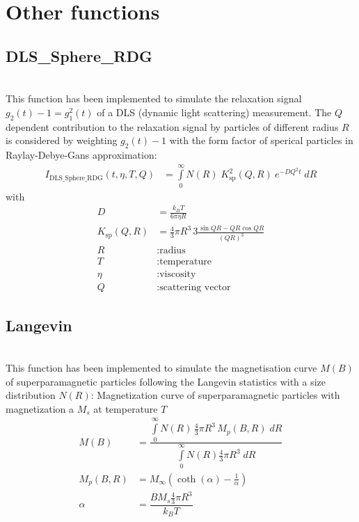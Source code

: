 \section{Other functions}

\subsection{DLS\_Sphere\_RDG}  ~\\

This function has been implemented to simulate the relaxation
signal $g_2(t)-1 = g_1^2(t)$ of a DLS (dynamic light scattering)
measurement. The $Q$ dependent contribution to the relaxation
signal by particles of different radius $R$ is considered by
weighting $g_2(t)-1$ with the form factor of sperical particles in
Raylay-Debye-Gans approximation:
\begin{align}
   I_\text{DLS\_Sphere\_RDG} (t,\eta,T,Q) &=  \int\limits_0^\infty N(R) \; K^2_\text{sp}(Q,R)
   \: e^{-D Q^2t} \; dR
\end{align}
with
\begin{align}
   D        & = \frac{k_BT}{6\pi\eta R} \nonumber \\
   K_\text{sp}(Q,R) & = \frac{4}{3}\pi R^3  \, 3 \frac{\sin QR - QR \cos
   QR}{(QR)^3}\nonumber\\
   R & : \text {radius} \nonumber \\
   T & : \text {temperature} \nonumber \\
   \eta & : \text {viscosity} \nonumber \\
   Q & : \text {scattering vector} \nonumber
\end{align}


\clearpage
\subsection{Langevin}  ~\\

This function has been implemented to simulate the magnetisation
curve $M(B)$ of superparamagnetic particles following the Langevin
statistics with a size distribution $N(R)$: Magnetization curve of
superparamagnetic particles with magnetization a $M_s$ at
temperature $T$
\begin{align}
M(B) & = \dfrac{\int\limits_0^\infty N(R)\, \tfrac{4}{3}\pi R^3\,
M_{p}(B,R) \; dR}{\int\limits_0^\infty N(R) \tfrac{4}{3}\pi
R^3\;dR}
\\[3mm]
M_{p}(B,R)  & = M_\infty\left(\coth(\alpha) - \tfrac{1}{\alpha}\right)  \nonumber \\
\alpha       & = \dfrac{B M_s \tfrac{4}{3}\pi R^3}{k_B T}
\nonumber
\end{align}

